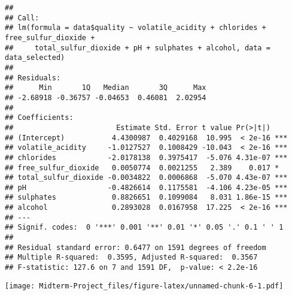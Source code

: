 \documentclass{article}
\begin{document}
\begin{Shaded}
\begin{Highlighting}[]
\OtherTok{\textless{}{-}} \NormalTok{(vif)[vif }\SpecialCharTok{\textgreater{}} \NormalTok{]}

\end{Highlighting}
\end{Shaded}

\begin{verbatim}
## 
## Call:
## lm(formula = data$quality ~ volatile_acidity + chlorides + free_sulfur_dioxide + 
##     total_sulfur_dioxide + pH + sulphates + alcohol, data = data_selected)
## 
## Residuals:
##      Min       1Q   Median       3Q      Max 
## -2.68918 -0.36757 -0.04653  0.46081  2.02954 
## 
## Coefficients:
##                        Estimate Std. Error t value Pr(>|t|)    
## (Intercept)           4.4300987  0.4029168  10.995  < 2e-16 ***
## volatile_acidity     -1.0127527  0.1008429 -10.043  < 2e-16 ***
## chlorides            -2.0178138  0.3975417  -5.076 4.31e-07 ***
## free_sulfur_dioxide   0.0050774  0.0021255   2.389    0.017 *  
## total_sulfur_dioxide -0.0034822  0.0006868  -5.070 4.43e-07 ***
## pH                   -0.4826614  0.1175581  -4.106 4.23e-05 ***
## sulphates             0.8826651  0.1099084   8.031 1.86e-15 ***
## alcohol               0.2893028  0.0167958  17.225  < 2e-16 ***
## ---
## Signif. codes:  0 '***' 0.001 '**' 0.01 '*' 0.05 '.' 0.1 ' ' 1
## 
## Residual standard error: 0.6477 on 1591 degrees of freedom
## Multiple R-squared:  0.3595, Adjusted R-squared:  0.3567 
## F-statistic: 127.6 on 7 and 1591 DF,  p-value: < 2.2e-16
\end{verbatim}

\begin{Shaded}
\begin{Highlighting}[]
\NormalTok{(} \NormalTok{(}\NormalTok{, }\NormalTok{))}
\end{Highlighting}
\end{Shaded}

\texttt{[image: Midterm-Project\_files/figure-latex/unnamed-chunk-6-1.pdf]}

\begin{Shaded}
\begin{Highlighting}[]
\OtherTok{=} \SpecialCharTok{:}
\OtherTok{=}
\OtherTok{=}\NormalTok{ data[}\SpecialCharTok{{-}}\NormalTok{index, ]}
\end{Highlighting}
\end{Shaded}
\end{document}
